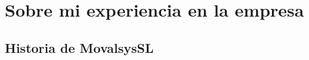 \chapter{Sobre mi experiencia en la empresa \label{sec:experiencia}}

	\section{Historia de MovalsysSL}